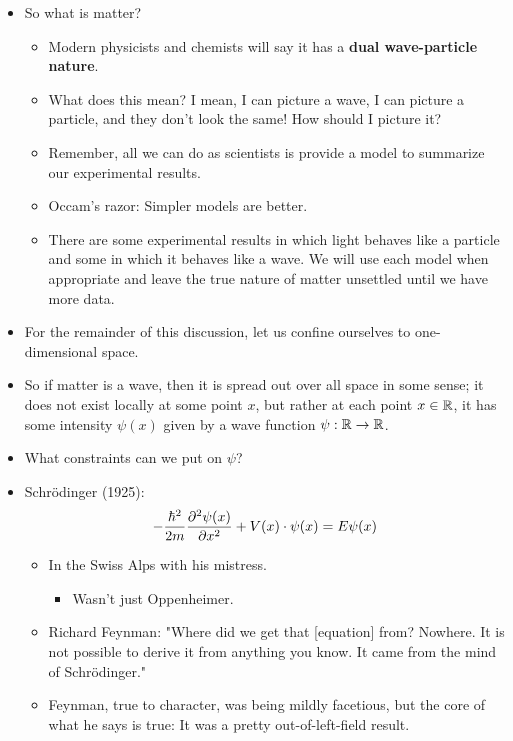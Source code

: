 \documentclass[../finalProject.tex]{subfiles}
\begin{document}
\begin{itemize}
\begin{itemize}
\begin{itemize}
        \end{itemize}
        \item So what is matter?
        \begin{itemize}
            \item Modern physicists and chemists will say it has a \textbf{dual wave-particle nature}.
            \item What does this mean? I mean, I can picture a wave, I can picture a particle, and they don't look the same! How should I picture it?
            \item Remember, all we can do as scientists is provide a model to summarize our experimental results.
            \item Occam's razor: Simpler models are better.
            \item There are some experimental results in which light behaves like a particle and some in which it behaves like a wave. We will use each model when appropriate and leave the true nature of matter unsettled until we have more data.
        \end{itemize}
        \item For the remainder of this discussion, let us confine ourselves to one-dimensional space.
        \item So if matter is a wave, then it is spread out over all space in some sense; it does not exist locally at some point $x$, but rather at each point $x\in\mathbb{R}$, it has some intensity $\psi(x)$ given by a wave function $\psi:\mathbb{R}\to\mathbb{R}$.
        \item What constraints can we put on $\psi$?
        \item Schr\"{o}dinger (1925):
        \begin{equation*}
            -\frac{\hbar^2}{2m}\pdv[2]{\psi(x)}{x}+V(x)\cdot\psi(x) = E\psi(x)
        \end{equation*}
        \begin{itemize}
            \item In the Swiss Alps with his mistress.
            \begin{itemize}
                \item Wasn't just Oppenheimer.
            \end{itemize}
            \item Richard Feynman: "Where did we get that [equation] from? Nowhere. It is not possible to derive it from anything you know. It came from the mind of Schr\"{o}dinger."
            \item Feynman, true to character, was being mildly facetious, but the core of what he says is true: It was a pretty out-of-left-field result.

\end{itemize}
\end{itemize}
\end{itemize}
\end{document}
